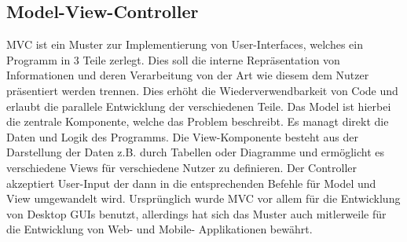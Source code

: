 \subsection{Model-View-Controller}
MVC ist ein Muster zur Implementierung von User-Interfaces, welches ein Programm in 3
Teile zerlegt. Dies soll die interne Repräsentation von Informationen und deren Verarbeitung
von der Art wie diesem dem Nutzer präsentiert werden trennen. Dies erhöht die Wiederverwendbarkeit
von Code und erlaubt die parallele Entwicklung der verschiedenen Teile. Das Model ist hierbei
die zentrale Komponente, welche das Problem beschreibt. Es managt direkt die Daten und Logik
des Programms. Die View-Komponente besteht aus der Darstellung der Daten z.B. durch Tabellen
oder Diagramme und ermöglicht es verschiedene Views für verschiedene Nutzer zu definieren.
Der Controller akzeptiert User-Input der dann in die entsprechenden Befehle für Model und 
View umgewandelt wird. Ursprünglich wurde MVC vor allem für die Entwicklung von Desktop 
GUIs benutzt, allerdings hat sich das Muster auch mitlerweile für die Entwicklung von 
Web- und Mobile- Applikationen bewährt. \cite{mvcwiki}


